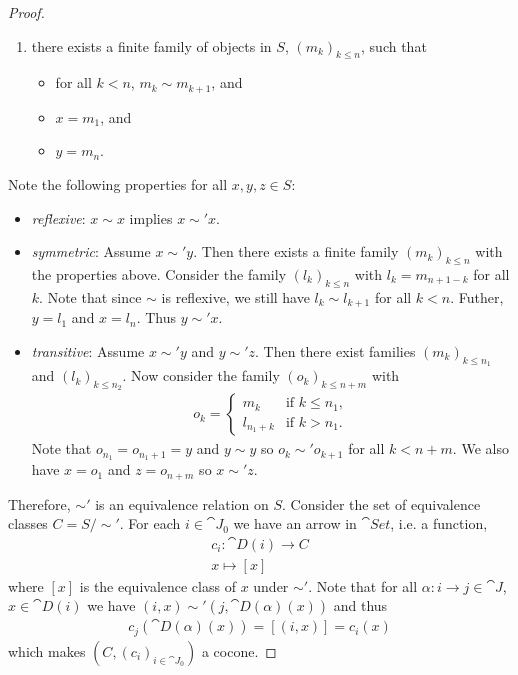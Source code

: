 \documentclass{article}
\begin{document}
\begin{proof}
\begin{enumerate}[label=E\arabic*.]
		\item there exists a finite family of objects in $S$, $(m_k)_{k\leq n}$, such that \begin{itemize}
			      \item for all $k<n$, $m_k\sim m_{k+1}$, and
			      \item $x=m_1$, and
			      \item $y=m_n$.
		      \end{itemize}
	\end{enumerate}
	Note the following properties for all $x,y,z\in S$:
	\begin{itemize}
		\item \emph{reflexive}: $x\sim x$ implies $x\sim'x$.
		\item \emph{symmetric}: Assume $x\sim'y$. Then there exists a finite family $(m_k)_{k\leq n}$ with the properties above.
		      Consider the family $(l_k)_{k\leq n}$ with $l_k = m_{n+1-k}$ for all $k$. Note that since $\sim$ is reflexive,
		      we still have $l_k\sim l_{k+1}$ for all $k<n$. Futher, $y=l_1$ and $x=l_n$. Thus $y\sim'x$.
		\item \emph{transitive}: Assume $x\sim'y$ and $y\sim'z$. Then there exist families $(m_k)_{k\leq n_1}$ and $(l_k)_{k\leq n_2}$.
		      Now consider the family $(o_k)_{k\leq n+m}$ with \begin{align*}
			      o_k = \begin{cases}
				            m_k       & \text{if } k\leq n_1, \\
				            l_{n_1+k} & \text{if } k > n_1.
			            \end{cases}
		      \end{align*}
		      Note that $o_{n_1}=o_{n_1+1}=y$ and $y\sim y$ so $o_k \sim' o_{k+1}$ for all $k<n+m$. We also have $x=o_1$ and $z=o_{n+m}$ so $x\sim'z$.
	\end{itemize}
	Therefore, $\sim'$ is an equivalence relation on $S$. Consider the set of equivalence classes $C=S/\sim'$.
	For each $i\in\cat J_0$ we have an arrow in $\cat{Set}$, i.e. a function,
	\begin{align*}
		c_i : \cat D(i) \to C \\
		x \mapsto [x]
	\end{align*}
	where $[x]$ is the equivalence class of $x$ under $\sim'$.
	Note that  for all $\alpha:i\to j\in\cat J$, $x\in \cat D(i)$ we have $(i,x)\sim'(j,\cat D(\alpha)(x))$ and thus
	\begin{align*}
		c_j(\cat D(\alpha)(x)) = [(i,x)] = c_i(x)
	\end{align*}
	which makes $(C, (c_i)_{i\in\cat J_0})$ a cocone.
\end{proof}
\end{document}
